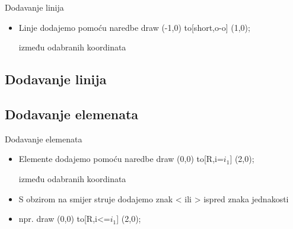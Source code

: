 \documentclass{beamer}
\begin{document}
\begin{frame}{Dodavanje linija}
    \begin{itemize}
        \item Linje dodajemo pomoću naredbe draw (-1,0) to[short,o-o] (1,0);
        
        između odabranih koordinata
    \end{itemize}
    
\end{frame}

\subsection{Dodavanje linija}


\subsection{Dodavanje elemenata}

\begin{frame}{Dodavanje elemenata}
    \begin{itemize}
        \item Elemente dodajemo pomoću naredbe draw (0,0) to[R,i=$i_1$] (2,0);
        
        između odabranih koordinata
        \item S obzirom na smijer struje dodajemo znak < ili > ispred znaka jednakosti
        \item npr. draw (0,0) to[R,i<=$i_1$] (2,0);
        
    \end{itemize}
\end{frame}

\end{document}
